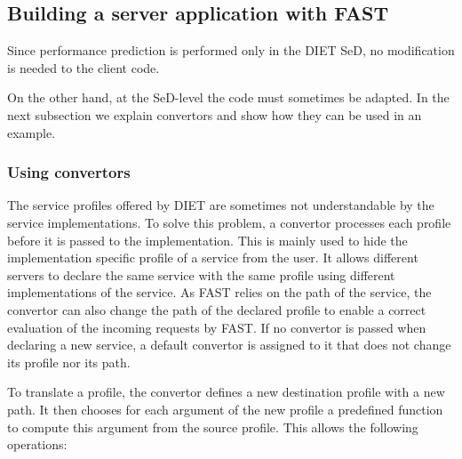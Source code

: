 \subsection{Building a server application with FAST}

Since performance prediction is performed only in the DIET SeD,
no modification is needed to the client code.

On the other hand, at the SeD-level the code must sometimes be adapted.  In
the next subsection we explain convertors and show how they can be used
in an example.

\subsubsection{Using convertors}

The service profiles offered by DIET are sometimes not
understandable by the service implementations. To solve this problem,
a convertor processes each profile before it is passed to the
implementation. This is mainly used to
hide the implementation specific profile of a service from
the user. It allows different servers to declare the same
service with the same profile using different implementations
of the service. As FAST relies on the path of the service, the
convertor can also change the path of the declared profile to
enable a correct evaluation of the incoming requests by FAST.
If no convertor is passed when declaring a new service, a
default convertor is assigned to it that does not change its
profile nor its path.

To translate a profile, the convertor defines a new
destination profile with a new path. It then chooses for
each argument of the new profile a predefined function
to compute this argument from the source profile. This
allows the following operations:

